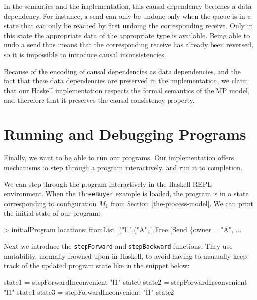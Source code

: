 \documentclass[runningheads,plain]{llncs}
\newenvironment{Shaded}{}{}
\newcommand{\DataTypeTok}[1]{\textcolor[rgb]{0.56,0.13,0.00}{#1}}
\newcommand{\StringTok}[1]{\textcolor[rgb]{0.25,0.44,0.63}{#1}}
\newcommand{\FunctionTok}[1]{\textcolor[rgb]{0.02,0.16,0.49}{#1}}
\newcommand{\NormalTok}[1]{#1}
\begin{document}
In the semantics and the implementation, this causal dependency becomes a data dependency. 
For instance, a send can only be undone only when the queue is in a state that can only be reached by first undoing the corresponding receive.
Only in this state the appropriate data  of the appropriate type is available.
Being able to undo a send thus means that the corresponding receive has already been reversed, so it is impossible to introduce causal inconsistencies. 

Because of the encoding of causal dependencies as data dependencies, and the fact that these data dependencies are preserved in the implementation,  
we claim that our Haskell implementation respects the formal semantics of the MP model, and therefore that it preserves the causal consistency property.


\section{Running and Debugging Programs}\label{running-debugging}

Finally, we want to be able to run our programs. Our implementation
offers mechanisms to step through a program interactively, and run it to
completion.

We can step through the program interactively in the Haskell REPL
environment. 
When the \texttt{ThreeBuyer} example is loaded, the program is in a state corresponding to configuration $M_1$ from Section \ref{the-process-model}.
We can print the initial state of our program:

\begin{Shaded}
\begin{Highlighting}[]
\FunctionTok{>}\NormalTok{ initialProgram}
\NormalTok{locations}\FunctionTok{:}\NormalTok{ fromList [(}\StringTok{"l1"}\NormalTok{,(}\StringTok{"A"}\NormalTok{,[],}\DataTypeTok{Free}\NormalTok{ (}\DataTypeTok{Send}\NormalTok{ \{owner }\FunctionTok{=} \StringTok{"A"}\NormalTok{, }\FunctionTok{...} 
\end{Highlighting}
\end{Shaded}

Next we introduce the \texttt{stepForward} and \texttt{stepBackward}
functions. They use mutability, normally frowned upon in Haskell, to
avoid having to manually keep track of the updated program state like in
the snippet below:

\begin{Shaded}
\begin{Highlighting}[]
\NormalTok{state1 }\FunctionTok{=}\NormalTok{ stepForwardInconvenient }\StringTok{"l1"}\NormalTok{ state0}
\NormalTok{state2 }\FunctionTok{=}\NormalTok{ stepForwardInconvenient }\StringTok{"l1"}\NormalTok{ state1}
\NormalTok{state3 }\FunctionTok{=}\NormalTok{ stepForwardInconvenient }\StringTok{"l1"}\NormalTok{ state2}
\end{Highlighting}
\end{Shaded}
\end{document}
